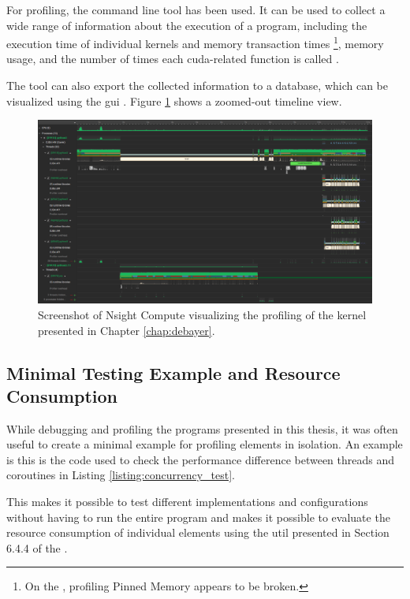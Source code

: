 For profiling, the  command line tool has been used.
It can be used to collect a wide range of information about the execution of a program, including the execution time of individual kernels and memory transaction times \footnote{On the \jx, profiling Pinned Memory appears to be broken.}, memory usage,
and the number of times each \gls{cuda}-related function is called \cite{nvidiaNVIDIANsightSystems2023}.

The  tool can also export the collected information to a  database, which can be visualized using the  \gls{gui} \cite{nvidiaNVIDIANsightSystems2023}.
Figure \ref{fig:nsight_timeline} shows a zoomed-out timeline view.

\begin{figure}[H]
    \centering
    \includegraphics[width=\textwidth]{figures/cuda/nsys_overall.png}
    \caption{Screenshot of Nsight Compute visualizing the profiling of the kernel presented in Chapter \ref{chap:debayer}.}
    \label{fig:nsight_timeline}
\end{figure}

\subsection{Minimal Testing Example and Resource Consumption}
While debugging and profiling the programs presented in this thesis, it was often useful to create a minimal example for profiling elements in isolation.
An example is this is the code used to check the performance difference between threads and coroutines in Listing \ref{listing:concurrency_test}.

This makes it possible to test different implementations and configurations without having to run the entire program and makes it possible to evaluate the resource consumption of individual elements using the  util presented in Section 6.4.4 of the \preproject.

